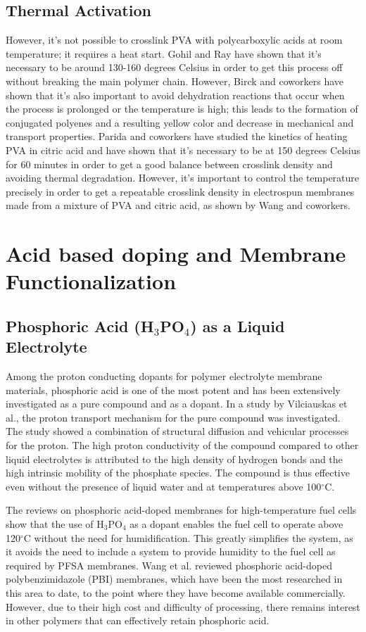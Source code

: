 \documentclass[12pt,a4paper]{report}
\begin{document}
\subsection{Thermal Activation}
However, it’s not possible to crosslink PVA with polycarboxylic acids at room temperature; it requires a heat start. Gohil and Ray have shown that it’s necessary to be around 130-160 degrees Celsius in order to get this process off without breaking the main polymer chain.\cite{34} However, Birck and coworkers have shown that it’s also important to avoid dehydration reactions that occur when the process is prolonged or the temperature is high; this leads to the formation of conjugated polyenes and a resulting yellow color and decrease in mechanical and transport properties.\cite{51} Parida and coworkers have studied the kinetics of heating PVA in citric acid and have shown that it’s necessary to be at 150 degrees Celsius for 60 minutes in order to get a good balance between crosslink density and avoiding thermal degradation.\cite{53} However, it’s important to control the temperature precisely in order to get a repeatable crosslink density in electrospun membranes made from a mixture of PVA and citric acid, as shown by Wang and coworkers.\cite{54}

\section{Acid based doping and Membrane Functionalization}
\subsection{Phosphoric Acid (H\(_3\)PO\(_4\)) as a Liquid Electrolyte}
Among the proton conducting dopants for polymer electrolyte membrane materials, phosphoric acid is one of the most potent and has been extensively investigated as a pure compound and as a dopant. In a study by Vilciauskas et al., the proton transport mechanism for the pure compound was investigated. The study showed a combination of structural diffusion and vehicular processes for the proton.\cite{21} The high proton conductivity of the compound compared to other liquid electrolytes is attributed to the high density of hydrogen bonds and the high intrinsic mobility of the phosphate species. The compound is thus effective even without the presence of liquid water and at temperatures above 100\(^\circ\)C.\cite{55}

The reviews on phosphoric acid-doped membranes for high-temperature fuel cells show that the use of H\(_3\)PO\(_4\) as a dopant enables the fuel cell to operate above 120\(^\circ\)C without the need for humidification. This greatly simplifies the system, as it avoids the need to include a system to provide humidity to the fuel cell as required by PFSA membranes.\cite{56,57} Wang et al. reviewed phosphoric acid-doped polybenzimidazole (PBI) membranes, which have been the most researched in this area to date, to the point where they have become available commercially. However, due to their high cost and difficulty of processing, there remains interest in other polymers that can effectively retain phosphoric acid.\cite{58}
\end{document}
